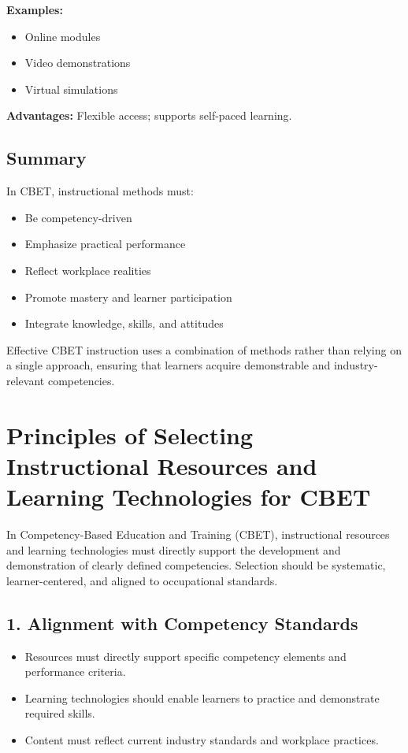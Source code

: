 \documentclass[12pt,a4paper]{article}
\begin{document}
\textbf{Examples:}
\begin{itemize}
    \item Online modules
    \item Video demonstrations
    \item Virtual simulations
\end{itemize}

\textbf{Advantages:} Flexible access; supports self-paced learning.

\subsection*{Summary}
In CBET, instructional methods must:
\begin{itemize}
    \item Be competency-driven
    \item Emphasize practical performance
    \item Reflect workplace realities
    \item Promote mastery and learner participation
    \item Integrate knowledge, skills, and attitudes
\end{itemize}

Effective CBET instruction uses a combination of methods rather than relying on a single approach, ensuring that learners acquire demonstrable and industry-relevant competencies.

\section*{Principles of Selecting Instructional Resources and Learning Technologies for CBET}
In Competency-Based Education and Training (CBET), instructional resources and learning technologies must directly support the development and demonstration of clearly defined competencies. Selection should be systematic, learner-centered, and aligned to occupational standards.

\subsection*{1. Alignment with Competency Standards}
\begin{itemize}
    \item Resources must directly support specific competency elements and performance criteria.
    \item Learning technologies should enable learners to practice and demonstrate required skills.
    \item Content must reflect current industry standards and workplace practices.
\end{itemize}
\end{document}

